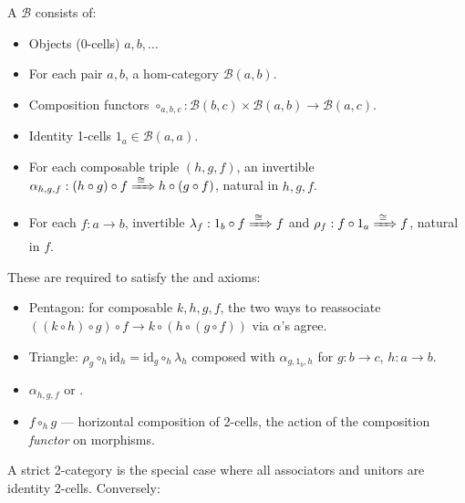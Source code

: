 \begin{definition}[Bicategory]
\label{def:bicategory}
A  $\mathcal{B}$ consists of:
\begin{itemize}
  \item Objects (0-cells) $a, b, \ldots$
  \item For each pair $a, b$, a hom-category $\mathcal{B}(a,b)$.
  \item Composition functors $\circ_{a,b,c} : \mathcal{B}(b,c) \times \mathcal{B}(a,b)
        \to \mathcal{B}(a,c)$.
  \item Identity 1-cells $1_a \in \mathcal{B}(a,a)$.
  \item For each composable triple $(h, g, f)$, an invertible 
        $\alpha_{h,g,f} : (h \circ g) \circ f \xRightarrow{\;\cong\;}
         h \circ (g \circ f)$, natural in $h, g, f$.
  \item For each $f : a \to b$, invertible 
        $\lambda_f : 1_b \circ f \xRightarrow{\;\cong\;} f$ and
        $\rho_f : f \circ 1_a \xRightarrow{\;\cong\;} f$, natural in $f$.
\end{itemize}
These are required to satisfy the  and  axioms:
\begin{itemize}
  \item Pentagon: for composable $k, h, g, f$, the two ways to reassociate
        $((k \circ h) \circ g) \circ f \to k \circ (h \circ (g \circ f))$
        via $\alpha$'s agree.
  \item Triangle: $\rho_g \circ_h \mathrm{id}_h = \mathrm{id}_g \circ_h \lambda_h$
        composed with $\alpha_{g,1_b,h}$ for $g : b \to c$, $h : a \to b$.
\end{itemize}
\end{definition}

\begin{howtosay}
\begin{itemize}
  \item $\alpha_{h,g,f}$  or .
  \item $f \circ_h g$  — horizontal composition of
        2-cells, the action of the composition \emph{functor} on morphisms.
\end{itemize}
\end{howtosay}

A strict 2-category is the special case where all associators and unitors are
identity 2-cells. Conversely:

